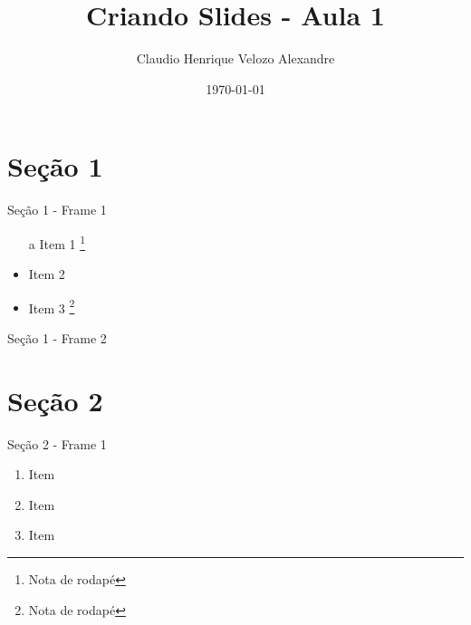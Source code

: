 \documentclass[aspectratio=149]{beamer}
\title{Criando Slides - Aula 1}
\author[Claudio Henrique]{Claudio Henrique Velozo Alexandre}
\institute{Universidade Federal do Maranhão}
\date{\today}
\begin{document}
\frame{\maketitle} 






\section{Seção 1}
	\begin{frame}{Seção 1 - Frame 1}
		\begin{itemize}
			\item[a] Item 1 \footnote{Nota de rodapé}
			\item Item 2
			\item Item 3 \footnote[9]{Nota de rodapé}
		\end{itemize}
	\end{frame}
	
	\begin{frame}{Seção 1 - Frame 2}
		\lipsum[1-1]
	\end{frame}

\section{Seção 2}

	\begin{frame}{Seção 2 - Frame 1}
		\begin{enumerate} [<+- | alert@+>] %
			\item Item
			\item Item
			\item Item
		\end{enumerate}
	\end{frame}
	
\end{document}
